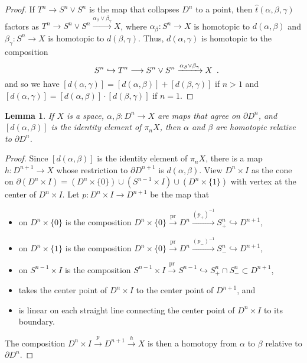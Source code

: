 \documentclass{amsart}
\numberwithin{equation}{section}
\theoremstyle{slplain}
\newtheorem{lem}[equation]{Lemma}
\theoremstyle{definition}
\theoremstyle{remark}
\newcommand{\pr}{\mathrm{pr}}
\newcommand{\bdry}{\partial}
\newcommand{\Period}{\rlap{\enspace .}}
\begin{document}
\begin{proof}
  If $T^{n} \to S^{n} \vee S^{n}$ is the map that collapses $D^{n}$ to
  a point, then $\hat t(\alpha,\beta,\gamma)$ factors as $T^{n} \to
  S^{n} \vee S^{n} \xrightarrow{\alpha_{\beta} \vee \beta_{\gamma}}
  X$, where $\alpha_{\beta}\colon S^{n} \to X$ is homotopic to
  $d(\alpha,\beta)$ and $\beta_{\gamma}\colon S^{n} \to X$ is
  homotopic to $d(\beta,\gamma)$.  Thus, $d(\alpha,\gamma)$ is
  homotopic to the composition
  \begin{displaymath}
    S^{n} \hookrightarrow T^{n} \longrightarrow S^{n} \vee S^{n}
    \xrightarrow{\alpha_{\beta} \vee \beta_{\gamma}} X \Period
  \end{displaymath}
  and so we have $[d(\alpha,\gamma)] = [d(\alpha,\beta)] +
  [d(\beta,\gamma)]$ if $n>1$ and $[d(\alpha,\gamma)] =
  [d(\alpha,\beta)] \cdot [d(\beta,\gamma)]$ if $n=1$.
\end{proof}


\begin{lem}
  \label{lem:DskHmtp}
  If $X$ is a space, $\alpha,\beta\colon D^{n} \to X$ are maps that
  agree on $\bdry D^{n}$, and $[d(\alpha,\beta)]$ is the identity
  element of $\pi_{n}X$, then $\alpha$ and $\beta$ are homotopic
  relative to $\bdry D^{n}$.
\end{lem}

\begin{proof}
  Since $[d(\alpha,\beta)]$ is the identity element of $\pi_{n}X$,
  there is a map $h\colon D^{n+1} \to X$ whose restriction to $\bdry
  D^{n+1}$ is $d(\alpha,\beta)$.  View $D^{n}\times I$ as the cone on
  $\bdry(D^{n}\times I) = (D^{n}\times \{0\}) \cup (S^{n-1}\times I)
  \cup (D^{n}\times\{1\})$ with vertex at the center of $D^{n}\times
  I$.  Let $p\colon D^{n}\times I \to D^{n+1}$ be the map that
  \begin{itemize}
  \item on $D^{n}\times \{0\}$ is the composition $D^{n}\times\{0\}
    \xrightarrow{\pr} D^{n} \xrightarrow{(p_{+})^{-1}} S^{n}_{+}
    \hookrightarrow D^{n+1}$,
  \item on $D^{n}\times \{1\}$ is the composition $D^{n}\times\{0\}
    \xrightarrow{\pr} D^{n} \xrightarrow{(p_{-})^{-1}} S^{n}_{-}
    \hookrightarrow D^{n+1}$,
  \item on $S^{n-1}\times I$ is the composition $S^{n-1}\times I
    \xrightarrow{\pr} S^{n-1} \hookrightarrow S^{n}_{+}\cap S^{n}_{-}
    \subset D^{n+1}$,
  \item takes the center point of $D^{n}\times I$ to the center point
    of $D^{n+1}$, and
  \item is linear on each straight line connecting the center point of
    $D^{n}\times I$ to its boundary.
  \end{itemize}
    The composition $D^{n}\times I \xrightarrow{p} D^{n+1}
    \xrightarrow{h} X$ is then a homotopy from $\alpha$ to $\beta$
    relative to $\bdry D^{n}$.
\end{proof}
\end{document}
